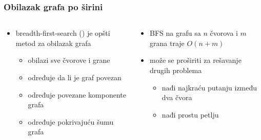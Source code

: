 \documentclass[compress,aspectratio=169]{beamer}
\begin{document}
\begin{frame}[fragile]
  \frametitle{Obilazak grafa po širini}
  \begin{columns}
    \begin{column}[t]{8cm}
      \begin{itemize}
        \item breadth-first-search () je opšti metod za 
        obilazak grafa
        \begin{itemize}
          \item obilazi sve čvorove i grane
          \item određuje da li je graf povezan
          \item određuje povezane komponente grafa
          \item određuje pokrivajuću šumu grafa
        \end{itemize}
      \end{itemize}
    \end{column}
    \begin{column}[t]{8cm}
      \begin{itemize}
        \item BFS na grafu sa $n$ čvorova i $m$ grana traje $O(n+m)$
        \item može se proširiti za rešavanje drugih problema
        \begin{itemize}
          \item nađi najkraću putanju između dva čvora
          \item nađi prostu petlju
        \end{itemize}
      \end{itemize}
    \end{column}
  \end{columns}
\end{frame}
\end{document}
